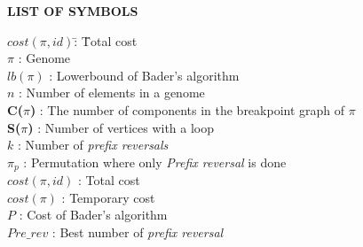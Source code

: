 \begin{center}
  \textbf{{\Large LIST OF SYMBOLS}}\\[60pt]
\end{center}

	\begin{tabbing}
		\textbf{$cost(\pi,id)$}\quad\= : \= Total cost\kill\\
		\textbf{$\pi$}\quad 				\> : \> Genome\\
		\textbf{$lb(\pi)$}\quad 		\> : \> Lowerbound of Bader's algorithm\\
		\textbf{$n$}\quad 					\> : \> Number of elements in a genome\\
		\textbf{ C($\pi$)}\quad 		\> : \> The number of components in the breakpoint graph of $\pi$\\
		\textbf{ S($\pi$)}\quad 		\> : \> Number of vertices with a loop \\
		\textbf{$k$}\quad 					\> : \> Number of \emph{prefix reversals}\\
		\textbf{$\pi_{p}$}\quad 		\> : \> Permutation where only \emph{Prefix reversal} is done\\
		\textbf{$cost(\pi,id)$}\quad\> : \> Total cost\\
		\textbf{$cost(\pi)$}\quad 	\> : \> Temporary cost\\
		\textbf{$P$}\quad 					\> : \> Cost of Bader's algorithm\\
		\textbf{$Pre\_rev$}\quad 		\> : \> Best number of \emph{prefix reversal}\\
	\end{tabbing}